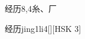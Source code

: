 \begin{entry}{经历}{8,4}{⽷、⼚}
  \begin{phonetics}{经历}{jing1li4}[][HSK 3]
  \end{phonetics}
\end{entry}
